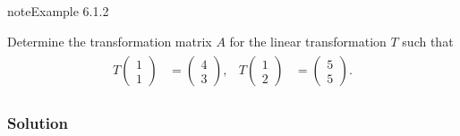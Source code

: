 \documentclass[letterpaper,10pt,english]{jupyterBook}
\begin{document}
\begin{sphinxadmonition}{note}{Example 6.1.2}



\sphinxAtStartPar
Determine the transformation matrix \(A\) for the linear transformation \(T\) such that
\begin{equation*}
\begin{split} \begin{align*}
    T\begin{pmatrix} 1 \\ 1 \end{pmatrix} &= \begin{pmatrix} 4 \\ 3 \end{pmatrix}, &
    T\begin{pmatrix} 1 \\ 2 \end{pmatrix} &= \begin{pmatrix} 5 \\ 5 \end{pmatrix}.
\end{align*} \end{split}
\end{equation*}\subsubsection*{Solution}


\end{sphinxadmonition}
\end{document}

